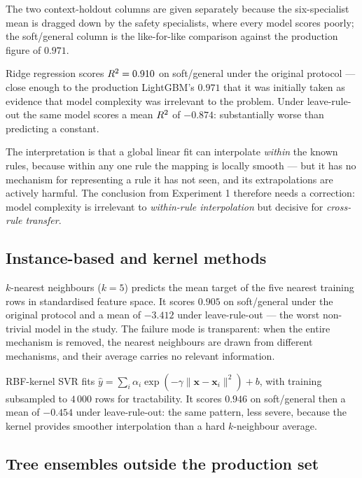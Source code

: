 \noindent The two context-holdout columns are given separately because the
six-specialist mean is dragged down by the safety specialists, where every
model scores poorly; the soft/general column is the like-for-like
comparison against the production figure of $0.971$.

\begin{findingbox}[title=The linear-model collapse]
Ridge regression scores $R^2 = 0.910$ on soft/general under the original
protocol --- close enough to the production LightGBM's $0.971$ that it was
initially taken as evidence that model complexity was irrelevant to the
problem. Under leave-rule-out the same model scores a mean $R^2$ of
$-0.874$: substantially worse than predicting a constant.

The interpretation is that a global linear fit can interpolate
\emph{within} the known rules, because within any one rule the mapping is
locally smooth --- but it has no mechanism for representing a rule it has
not seen, and its extrapolations are actively harmful. The conclusion from
Experiment 1 therefore needs a correction: model complexity is irrelevant
to \emph{within-rule interpolation} but decisive for \emph{cross-rule
transfer}.
\end{findingbox}

\subsection{Instance-based and kernel methods}

$k$-nearest neighbours ($k=5$) predicts the mean target of the five
nearest training rows in standardised feature space. It scores $0.905$ on
soft/general under the original protocol and a mean of $-3.412$ under
leave-rule-out --- the worst non-trivial model in the study. The failure
mode is transparent: when the entire mechanism is removed, the nearest
neighbours are drawn from different mechanisms, and their average carries
no relevant information.

RBF-kernel SVR fits
$\hat{y} = \sum_i \alpha_i \exp(-\gamma \lVert \mathbf{x} - \mathbf{x}_i \rVert^2) + b$,
with training subsampled to $4\,000$ rows for tractability. It scores
$0.946$ on soft/general then a mean of $-0.454$ under leave-rule-out: the
same pattern, less severe, because the kernel provides smoother
interpolation than a hard $k$-neighbour average.

\subsection{Tree ensembles outside the production set}

